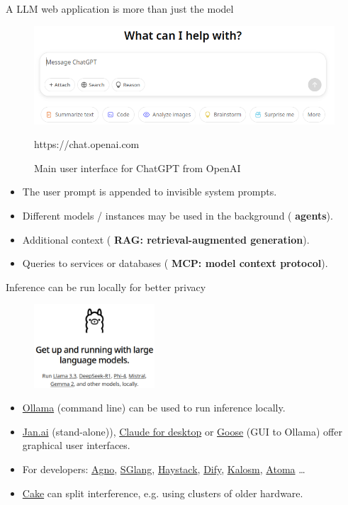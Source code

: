\documentclass[10pt]{beamer}
\newcommand{\credit}[1]{{\par \raggedleft \scriptsize \mdseries \color{mDarkBrown} #1 \par}}
\newcommand{\feature}[1]{{\color{scLime} \textbf{#1}}}
\begin{document}
\begin{frame}{A LLM web application is more than just the model}
	\begin{figure}
		\includegraphics[width=\textwidth]{figures/OpenAIChatUI.png}
		\caption{Main user interface for ChatGPT from OpenAI}
		\credit{https://chat.openai.com}
	\end{figure}
		\begin{itemize}
			\item The user prompt is appended to invisible system prompts.
			\item Different models / instances may be used in the background (\feature{agents}).
			\item Additional context (\feature{RAG: retrieval-augmented generation}).
			\item Queries to services or databases (\feature{MCP: model context protocol}).
		\end{itemize}
\end{frame}

\begin{frame}[fragile]{Inference can be run locally for better privacy}
	\begin{figure}
		\includegraphics[width=0.4\textwidth]{figures/Ollama.png}
	\end{figure}
	\begin{itemize}
		\item \href{https://ollama.com}{Ollama} (command line) can be used to run inference locally.
		\item \href{https://jan.ai}{Jan.ai} (stand-alone)), \href{https://claude.ai/download}{Claude for desktop} or \href{https://block.github.io/goose}{Goose} (GUI to Ollama) offer graphical user interfaces.
		\item For developers: \href{https://github.com/agno-agi/agno}{Agno}, \href{https://github.com/sgl-project/sglang}{SGlang}, \href{https://haystack.deepset.ai/}{Haystack}, \href{https://github.com/langgenius/dify}{Dify}, \href{https://crates.io/crates/kalosm}{Kalosm}, \href{https://github.com/atoma-network/atoma-infer}{Atoma} \dots
		\item \href{https://github.com/evilsocket/cake}{Cake} can split interference, e.g. using clusters of older hardware.
	\end{itemize}
\end{frame}
\end{document}
